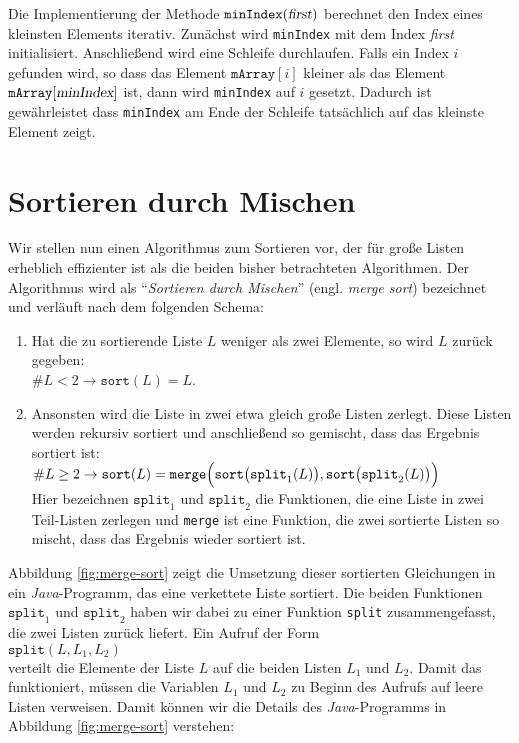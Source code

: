 Die Implementierung der Methode $\texttt{minIndex}(\textsl{first})$ berechnet den Index eines kleinsten
Elements iterativ.  Zun\"achst wird \texttt{minIndex} mit dem Index \textsl{first}
initialisiert.  Anschlie{\ss}end wird eine Schleife durchlaufen.  Falls ein
Index $i$ gefunden wird, so dass das Element $\mathtt{mArray}[i]$ kleiner als das Element
$\texttt{mArray}[\textsl{minIndex}]$ ist, dann wird \texttt{minIndex} auf $i$ gesetzt.
Dadurch ist gew\"ahrleistet dass \texttt{minIndex} am Ende der Schleife tats\"achlich auf das
kleinste Element zeigt.

\section{Sortieren durch Mischen}
Wir stellen nun einen Algorithmus zum Sortieren vor, der f\"ur gro{\ss}e Listen erheblich
effizienter ist als die beiden bisher betrachteten Algorithmen.  Der Algorithmus wird als
``\emph{Sortieren durch Mischen}'' (engl. \emph{merge sort}) bezeichnet und verl\"auft nach dem folgenden Schema:
\begin{enumerate}
\item Hat die zu sortierende Liste $L$ weniger als zwei Elemente, so wird $L$ zur\"uck
      gegeben: \\[0.2cm]
      \hspace*{1.3cm} $\#L < 2 \rightarrow \mathtt{sort}(L) = L$.
\item Ansonsten wird die Liste in zwei etwa gleich gro{\ss}e Listen zerlegt.
      Diese Listen werden rekursiv sortiert und anschlie{\ss}end so gemischt, dass
      das Ergebnis sortiert ist: \\[0.2cm]
      \hspace*{1.3cm} 
 $\#L \geq 2 \rightarrow \mathtt{sort}(L) = \mathtt{merge}\Bigl(\mathtt{sort}\bigl(\mathtt{split}_1(L)\bigr), \mathtt{sort}\bigl(\mathtt{split}_2(L)\bigr)\Bigr)$
     \\[0.2cm]
     Hier bezeichnen $\texttt{split}_1$ und $\mathtt{split}_2$ die Funktionen, die eine Liste in zwei Teil-Listen zerlegen
     und \texttt{merge} ist eine Funktion, die zwei sortierte Listen so mischt, dass das Ergebnis wieder sortiert ist.
\end{enumerate}
Abbildung \ref{fig:merge-sort} zeigt die Umsetzung dieser sortierten Gleichungen 
in ein \textsl{Java}-Programm, das eine verkettete Liste sortiert. 
Die beiden Funktionen $\mathtt{split}_1$ und $\mathtt{split}_2$ haben wir dabei
zu einer Funktion \texttt{split} zusammengefasst, die zwei Listen zur\"uck liefert. Ein
Aufruf der Form
\\[0.2cm]
\hspace*{1.3cm}
$\mathtt{split}(L, L_1, L_2)$
\\[0.2cm]
verteilt die Elemente der Liste $L$ auf die beiden Listen $L_1$ und $L_2$.  
Damit das funktioniert, m\"ussen die Variablen $L_1$ und $L_2$ zu Beginn des Aufrufs auf
leere Listen verweisen.  Damit k\"onnen wir die Details des \textsl{Java}-Programms in
Abbildung \ref{fig:merge-sort} verstehen:


